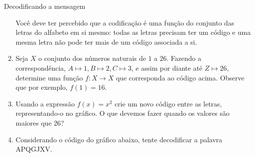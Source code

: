 \begin{task}{ Decodificando a mensagem}
\begin{enumerate}
Você deve ter percebido que a codificação é uma função do conjunto das letras do alfabeto em si mesmo: todas as letras precisam ter um código e uma mesma letra não pode ter mais de um código associada a si.

\item {} 
Seja \(X\) o conjunto dos números naturais de \(1\) a \(26\). Fazendo a correspondência, \(A \mapsto 1, B \mapsto 2, C \mapsto 3\), e assim por diante até \(Z \mapsto 26\), determine uma função \(f:X\to X\) que corresponda ao código acima. Observe que por exemplo, \(f(1)=16\).

\item {} 
Usando a expressão \(f(x)=x^2\) crie um novo código entre as letras, representando-o no gráfico. O que devemos fazer quando os valores são  maiores que 26?

\item {} 
Considerando o código do gráfico abaixo, tente decodificar a palavra APQGJXV.

\begin{figure}[H]
\centering


\end{figure}
\end{enumerate}
\end{task}
